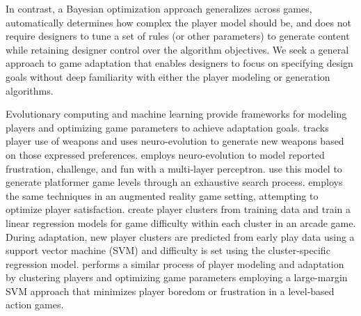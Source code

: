 \documentclass[letterpaper]{article}
\begin{document}
In contrast, a Bayesian optimization approach generalizes across games, automatically determines how complex the player model should be, and does not require designers to tune a set of rules (or other parameters) to generate content while retaining designer control over the algorithm objectives. We seek a general approach to game adaptation that enables designers to focus on specifying design goals without deep familiarity with either the player modeling or generation algorithms.




Evolutionary computing and machine learning provide frameworks for modeling players and optimizing game parameters to achieve adaptation goals.
\cite{hastings2009:gar} tracks player use of weapons and uses neuro-evolution to generate new weapons based on those expressed preferences.
\cite{pedersen2009:smb} employs neuro-evolution to model reported frustration, challenge, and fun with a multi-layer perceptron. 
\cite{shaker2010:platformer-gen} use this model to generate platformer game levels through an exhaustive search process. 
\cite{yannakakis2009:playermodel} employs the same techniques in an augmented reality game setting, attempting to optimize player satisfaction.
\cite{missura2009:dda} create player clusters from training data and train a linear regression models for game difficulty within each cluster in an arcade game. During adaptation, new player clusters are predicted from early play data using a support vector machine (SVM) and difficulty is set using the cluster-specific regression model.
\cite{yu2011:minboredom} performs a similar process of player modeling and adaptation by clustering players and optimizing game parameters employing a large-margin SVM approach that minimizes player boredom or frustration in a level-based action games.
\end{document}
